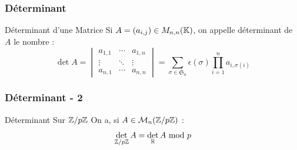 \documentclass{beamercours}
\begin{document}
\begin{frame}
\frametitle{Déterminant}
\begin{définition}{Déterminant d'une Matrice}{}
Si $A = (a_{i, j}) \in M_{n, n}(\mathbb{K})$, on appelle déterminant de $A$ le nombre : \vspace{-10pt}
\[
    \det A = \begin{vmatrix}
        a_{1, 1} & \cdots & a_{1, n} \\
        \vdots   & \ddots & \vdots   \\
        a_{n, 1} & \cdots & a_{n, n}
    \end{vmatrix} = \sum_{\sigma \in \mathfrak{S}_{n}}\epsilon(\sigma)\prod_{i = 1}^{n}a_{i, \sigma(i)}
\]
\end{définition}
\end{frame}

\begin{frame}
    \frametitle{Déterminant - 2}
    \begin{propositionfr}{Déterminant Sur $\mathbb{Z}/p\mathbb{Z}$}{}
        On a, si $A \in \mathcal{M}_{n}(\mathbb{Z}/p\mathbb{Z})$ :
        \[
            \det\limits_{\mathbb{Z}/p\mathbb{Z}} A = \det_{\mathbb{R}} A\ {\rm mod }\ p
        \]
    \end{propositionfr}
\end{frame}
\end{document}

